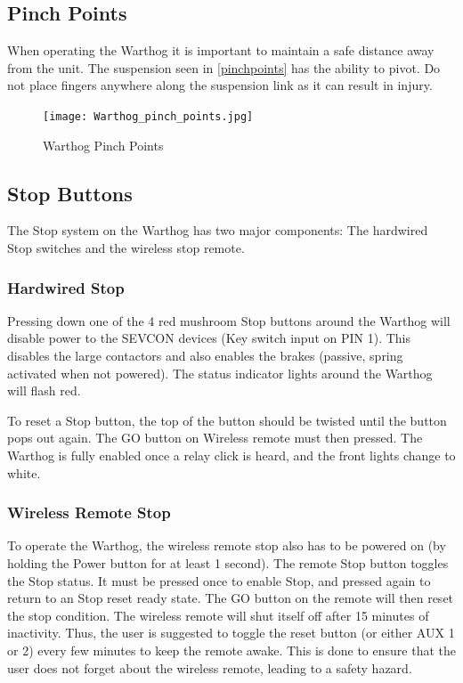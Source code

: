 \documentclass[]{clearpath-latex/clearpath-manual}
\begin{document}
\subsection{Pinch Points}

When operating the Warthog  it is important to maintain a safe distance away from the unit. The suspension seen in \autoref{pinchpoints} has the ability to pivot.  Do not place fingers anywhere along the suspension link as it can result in injury.

\begin{figure}[!htb]
  \centering
  \texttt{[image: Warthog\_pinch\_points.jpg]}
  \caption{Warthog Pinch Points}
  \label{pinchpoints}
\end{figure}

\pagebreak[4]
\subsection{Stop Buttons}

The Stop system on the Warthog has two major components: The hardwired Stop switches and the wireless stop remote.

\subsubsection{Hardwired Stop}

Pressing down one of the 4 red mushroom Stop buttons around the Warthog will disable power to the SEVCON devices (Key switch input on PIN 1). This disables the large contactors and also enables the brakes (passive, spring activated when not powered). The status indicator lights around the Warthog will flash red.

To reset a Stop button, the top of the button should be twisted until the button pops out again. The GO button on Wireless remote must then pressed. The Warthog is fully enabled once a relay click is heard, and the front lights change to white.

\subsubsection{Wireless Remote Stop}

To operate the Warthog, the wireless remote stop also has to be powered on (by holding the Power button for at least 1 second). The remote Stop button toggles the Stop status. It must be pressed once to enable Stop, and pressed again to return to an Stop reset ready state. The GO button on the remote will then reset the stop condition. The wireless remote will shut itself off after 15 minutes of inactivity. Thus, the user is suggested to toggle the reset button (or either AUX 1 or 2) every few minutes to keep the remote awake. This is done to ensure that the user does not forget about the wireless remote, leading to a safety hazard.
\end{document}
